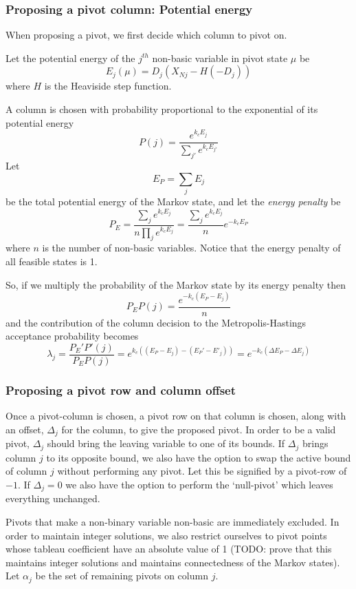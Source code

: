 \documentclass{article}
\begin{document}
\subsubsection{Proposing a pivot column: Potential energy}

When proposing a pivot, we first decide which column to pivot on.
 
Let the potential energy of the $j^{th}$ non-basic variable in pivot state $\mu$ be
\[
E_j(\mu) = D_j(X_{Nj} - H(-D_j))
\]
where $H$ is the Heaviside step function.

A column is chosen with probability proportional to the exponential of its potential energy
\[
P(j) = \frac{e^{k_cE_j}}{\sum_{j'} e^{k_cE_{j'}}}
\]
Let
\[
E_P = \sum_j E_j
\]
be the total potential energy of the Markov state, and let the \textit{energy penalty} be
\[
P_E = \frac{\sum_j e^{k_cE_j}}{n\prod_j e^{k_cE_j}} = \frac{\sum_j e^{k_cE_j}}{n} e^{-k_cE_P} 
\]
where $n$ is the number of non-basic variables. Notice that the energy penalty of all feasible states is 1.

So, if we multiply the probability of the Markov state by its energy penalty then
\[
P_EP(j) = \frac{e^{-k_c(E_P - E_j)}}{n}
\]
and the contribution of the column decision to the Metropolis-Hastings acceptance probability becomes
\[
\lambda_j = \frac{P_E'P'(j)}{P_EP(j)} = e^{k_c((E_P-E_j) - (E_P' - E'_j))} = e^{-k_c(\Delta E_P - \Delta E_j)}
\]

\subsubsection{Proposing a pivot row and column offset}

Once a pivot-column is chosen, a pivot row on that column is chosen, along with an offset, $\Delta_j$ for the column, to give the proposed pivot. In order to be a valid pivot, $\Delta_j$ should bring the leaving variable to one of its bounds. If $\Delta_j$ brings column $j$ to its opposite bound, we also have the option to swap the active bound of column $j$ without performing any pivot. Let this be signified by a pivot-row of $-1$. If $\Delta_j=0$ we also have the option to perform the `null-pivot' which leaves everything unchanged.

Pivots that make a non-binary variable non-basic are immediately excluded. In order to maintain integer solutions, we also restrict ourselves to pivot points whose tableau coefficient have an absolute value of 1 (TODO: prove that this maintains integer solutions and maintains connectedness of the Markov states). Let $\alpha_j$ be the set of remaining pivots on column $j$.
\end{document}
